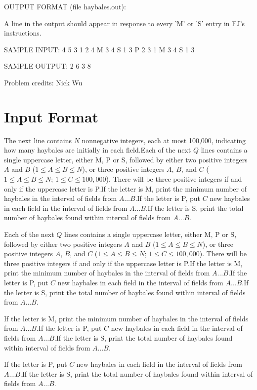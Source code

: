\documentclass[12pt]{article}
\begin{document}
OUTPUT FORMAT (file haybales.out):

A line in the output should appear in response to every 'M' or 'S' entry in FJ's
instructions.


SAMPLE INPUT:
4 5
3 1 2 4
M 3 4
S 1 3
P 2 3 1
M 3 4
S 1 3

SAMPLE OUTPUT: 
2
6
3
8

Problem credits: Nick Wu



\section*{Input Format}
The next line contains $N$ nonnegative integers, each at most 100,000,
indicating how many haybales are initially in each field.Each of the next $Q$ lines contains a single uppercase letter, either M, P or S,
followed by either two positive integers $A$ and $B$ ($1 \leq A \leq B \leq N$),
or three positive integers $A$, $B$, and $C$ ($1 \leq A \leq B \leq N$;
$1 \leq C \leq 100,000$).  There will be three positive integers if and only if
the uppercase letter is P.If the letter is M, print the minimum number of haybales in the interval of fields
from $A \ldots B$.If the letter is P, put $C$ new haybales in each field in the interval of fields
from $A \ldots B$.If the letter is S, print the total number of haybales found within interval of
fields from $A \ldots B$.

Each of the next $Q$ lines contains a single uppercase letter, either M, P or S,
followed by either two positive integers $A$ and $B$ ($1 \leq A \leq B \leq N$),
or three positive integers $A$, $B$, and $C$ ($1 \leq A \leq B \leq N$;
$1 \leq C \leq 100,000$).  There will be three positive integers if and only if
the uppercase letter is P.If the letter is M, print the minimum number of haybales in the interval of fields
from $A \ldots B$.If the letter is P, put $C$ new haybales in each field in the interval of fields
from $A \ldots B$.If the letter is S, print the total number of haybales found within interval of
fields from $A \ldots B$.

If the letter is M, print the minimum number of haybales in the interval of fields
from $A \ldots B$.If the letter is P, put $C$ new haybales in each field in the interval of fields
from $A \ldots B$.If the letter is S, print the total number of haybales found within interval of
fields from $A \ldots B$.

If the letter is P, put $C$ new haybales in each field in the interval of fields
from $A \ldots B$.If the letter is S, print the total number of haybales found within interval of
fields from $A \ldots B$.
\end{document}
